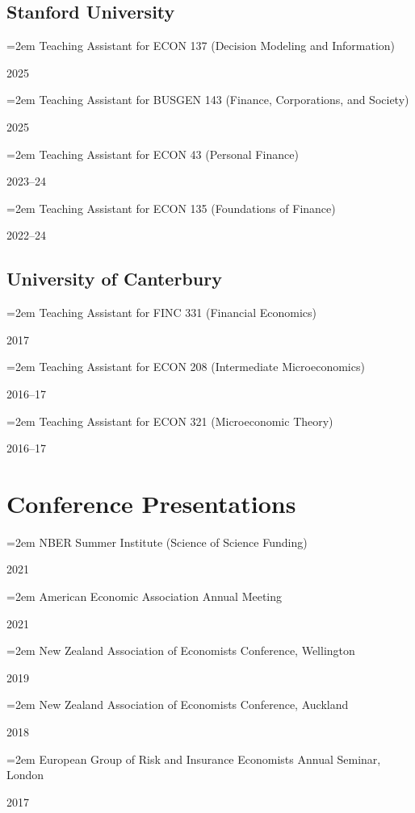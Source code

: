 \documentclass[11pt,oneside]{memoir}
\newcommand{\datedentry}[2]{\par\parbox[t]{0.9\linewidth}{\strut\raggedright\hangindent=2em #2\strut}\hfill#1}
\begin{document}
\subsection{Stanford University}
\datedentry{2025}{Teaching Assistant for ECON 137 (Decision Modeling and Information)}
\datedentry{2025}{Teaching Assistant for BUSGEN 143 (Finance, Corporations, and Society)}
\datedentry{2023--24}{Teaching Assistant for ECON 43 (Personal Finance)}
\datedentry{2022--24}{Teaching Assistant for ECON 135 (Foundations of Finance)}

\subsection{University of Canterbury}
\datedentry{2017}{Teaching Assistant for FINC 331 (Financial Economics)}
\datedentry{2016--17}{Teaching Assistant for ECON 208 (Intermediate Microeconomics)}
\datedentry{2016--17}{Teaching Assistant for ECON 321 (Microeconomic Theory)}

\section{Conference Presentations}

\datedentry{2021}{NBER Summer Institute (Science of Science Funding)}
\datedentry{2021}{American Economic Association Annual Meeting}
\datedentry{2019}{New Zealand Association of Economists Conference, Wellington}
\datedentry{2018}{New Zealand Association of Economists Conference, Auckland}
\datedentry{2017}{European Group of Risk and Insurance Economists Annual Seminar, London}
\end{document}
